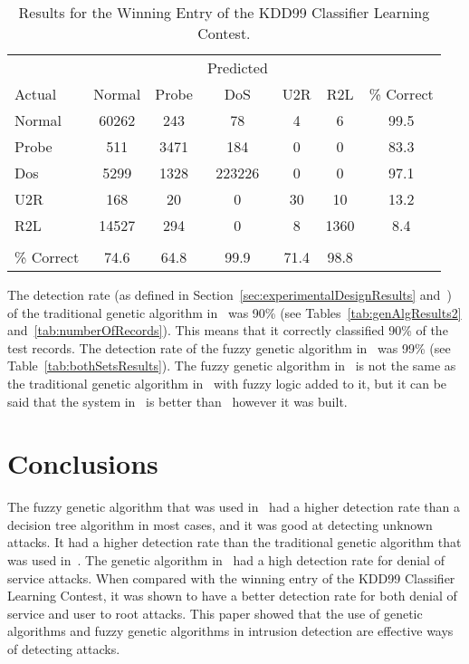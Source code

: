 \documentclass{sig-alternate}
\begin{document}
\begin{table*}
\center
\caption{Results for the Winning Entry of the KDD99 Classifier Learning Contest.}
\vspace{0.20cm}
\begin{tabular}{l|cccccc}
& & & Predicted & & &\\
Actual & Normal & Probe & DoS & U2R & R2L & \% Correct \\ \hline
Normal &  60262 & 243 & 78 & 4 & 6 & 99.5\\
Probe &  511 & 3471 & 184 & 0 & 0 & 83.3 \\
Dos &  5299 & 1328 & 223226 & 0 & 0 & 97.1\\
U2R &  168 & 20 & 0 & 30 & 10 & 13.2\\
R2L &  14527 & 294 & 0 & 8 & 1360 & 8.4\\
& &&&&& \\
\% Correct &  74.6 & 64.8 & 99.9 & 71.4 & 98.8 &\\
\end{tabular}
\center
\label{tab:winningEntry}
\end{table*}

The detection rate (as defined in Section~\ref{sec:experimentalDesignResults} and~\cite{6559603}) of the traditional genetic algorithm in~\cite{DBLP:journals/corr/abs-1204-1336} was 90\% (see Tables~\ref{tab:genAlgResults2} and~\ref{tab:numberOfRecords}). This means that it correctly classified 90\% of the test records. The detection rate of the fuzzy genetic algorithm in~\cite{6559603} was 99\% (see Table~\ref{tab:bothSetsResults}). The fuzzy genetic algorithm in~\cite{6559603} is not the same as the traditional genetic algorithm in~\cite{DBLP:journals/corr/abs-1204-1336} with fuzzy logic added to it, but it can be said that the system in~\cite{6559603} is better than~\cite{DBLP:journals/corr/abs-1204-1336} however it was built.

\section{Conclusions}
\label{sec:conclusion}
The fuzzy genetic algorithm that was used in~\cite{6496342, 6559603} had a higher detection rate than a decision tree algorithm in most cases, and it was good at detecting unknown attacks. It had a higher detection rate than the traditional genetic algorithm that was used in~\cite{DBLP:journals/corr/abs-1204-1336}. The genetic algorithm in~\cite{DBLP:journals/corr/abs-1204-1336} had a high detection rate for denial of service attacks. When compared with the winning entry of the KDD99 Classifier Learning Contest, it was shown to have a better detection rate for both denial of service and user to root attacks. This paper showed that the use of genetic algorithms and fuzzy genetic algorithms in intrusion detection are effective ways of detecting attacks.
\end{document}
